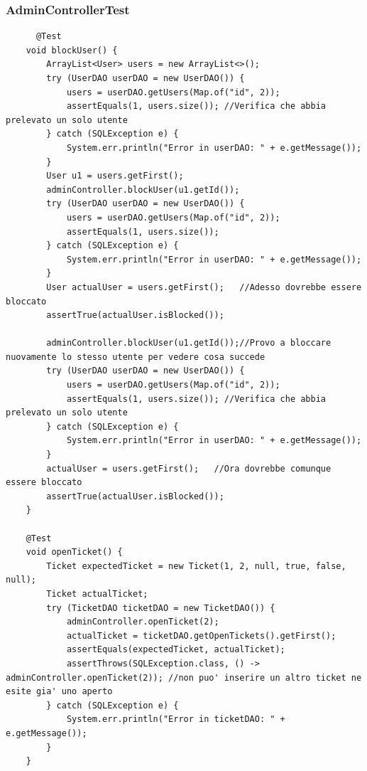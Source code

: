 \documentclass[a4paper, 11pt]{article}
\begin{document}
	\subsubsection{AdminControllerTest}
	\begin{lstlisting}
      @Test
    void blockUser() {
        ArrayList<User> users = new ArrayList<>();
        try (UserDAO userDAO = new UserDAO()) {
            users = userDAO.getUsers(Map.of("id", 2));
            assertEquals(1, users.size()); //Verifica che abbia prelevato un solo utente
        } catch (SQLException e) {
            System.err.println("Error in userDAO: " + e.getMessage());
        }
        User u1 = users.getFirst();
        adminController.blockUser(u1.getId());
        try (UserDAO userDAO = new UserDAO()) {
            users = userDAO.getUsers(Map.of("id", 2));
            assertEquals(1, users.size());
        } catch (SQLException e) {
            System.err.println("Error in userDAO: " + e.getMessage());
        }
        User actualUser = users.getFirst();   //Adesso dovrebbe essere bloccato
        assertTrue(actualUser.isBlocked());

        adminController.blockUser(u1.getId());//Provo a bloccare nuovamente lo stesso utente per vedere cosa succede
        try (UserDAO userDAO = new UserDAO()) {
            users = userDAO.getUsers(Map.of("id", 2));
            assertEquals(1, users.size()); //Verifica che abbia prelevato un solo utente
        } catch (SQLException e) {
            System.err.println("Error in userDAO: " + e.getMessage());
        }
        actualUser = users.getFirst();   //Ora dovrebbe comunque essere bloccato
        assertTrue(actualUser.isBlocked());
    }

    @Test
    void openTicket() {
        Ticket expectedTicket = new Ticket(1, 2, null, true, false, null);
        Ticket actualTicket;
        try (TicketDAO ticketDAO = new TicketDAO()) {
            adminController.openTicket(2);
            actualTicket = ticketDAO.getOpenTickets().getFirst();
            assertEquals(expectedTicket, actualTicket);
            assertThrows(SQLException.class, () -> adminController.openTicket(2)); //non puo' inserire un altro ticket ne esite gia' uno aperto
        } catch (SQLException e) {
            System.err.println("Error in ticketDAO: " + e.getMessage());
        }
    }
	\end{lstlisting}
\end{document}
